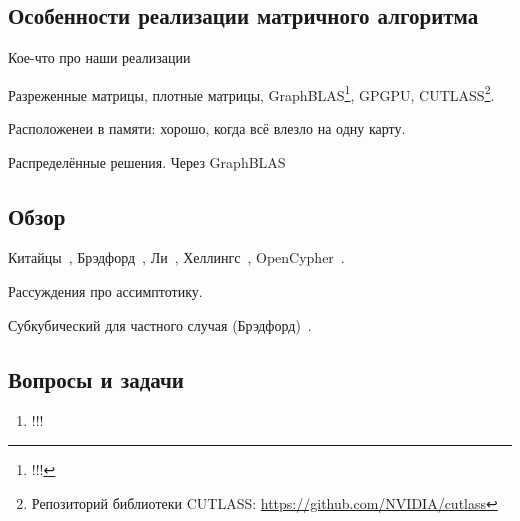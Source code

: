 \subsection{Особенности реализации матричного алгоритма}

Кое-что про наши реализации~\cite{Mishin:2019:ECP:3327964.3328503}

Разреженные матрицы, плотные матрицы, GraphBLAS\footnote{!!!}, GPGPU, CUTLASS\footnote{Репозиторий библиотеки CUTLASS: \url{https://github.com/NVIDIA/cutlass}}.

Расположенеи в памяти: хорошо, когда всё влезло на одну карту.

Распределённые решения.
Через GraphBLAS

\subsection{Обзор}

Китайцы~\cite{!!!}, Брэдфорд~\cite{!!!}, Ли~\cite{Lee:2002:FCG:505241.505242}, Хеллингс~\cite{!!!}, OpenCypher~\cite{Kuijpers:2019:ESC:3335783.3335791}.


Рассуждения про ассимптотику.

Субкубический для частного случая (Брэдфорд)~\cite{8249039}.

\subsection{Вопросы и задачи}
\begin{enumerate}
  \item !!!
\end{enumerate}
